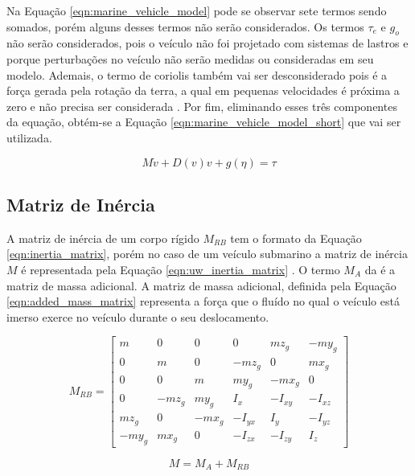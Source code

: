 Na Equação \ref{eqn:marine_vehicle_model} pode se observar sete termos sendo somados, porém alguns desses termos não serão considerados. Os termos $\tau_e$ e $g_o$ não serão considerados, pois o veículo não foi projetado com sistemas de lastros e porque perturbações no veículo não serão medidas ou consideradas em seu modelo. Ademais, o termo de coriolis também vai ser desconsiderado pois é a força gerada pela rotação da terra, a qual em pequenas velocidades é próxima a zero e não precisa ser considerada \cite{rov_modeling_1} \cite{rov_modeling_2}. Por fim, eliminando esses três componentes da equação, obtém-se a Equação \ref{eqn:marine_vehicle_model_short}  que vai ser utilizada.

\begin{equation}
	\label{eqn:marine_vehicle_model_short}
	M\dot{v} + D(v)v + g(\eta) = \tau 
\end{equation}

\subsection{Matriz de Inércia}

A matriz de inércia de um corpo rígido $M_{RB}$ tem o formato da Equação \ref{eqn:inertia_matrix}, porém no caso de um veículo submarino a matriz de inércia $M$ é representada pela Equação \ref{eqn:uw_inertia_matrix} \cite{fossen2011handbook}. O termo $M_A$ da é a matriz de massa adicional. A matriz de massa adicional, definida pela Equação \ref{eqn:added_mass_matrix} representa a força que o fluído no qual o veículo está imerso exerce no veículo durante o seu deslocamento. 

\begin{equation}
	\label{eqn:inertia_matrix}
	M_{RB} = 
	\begin{bmatrix}
		m & 0 & 0 & 0 & mz_g & -my_g\\
		0 & m & 0 & -mz_g & 0 & mx_g\\
		0 & 0 & m & my_g & -mx_g & 0\\
		0 & -mz_g & my_g & I_x & -I_{xy} & -I_{xz}\\
		mz_g & 0 & -mx_g & -I_{yx} & I_y & -I_{yz}\\
		-my_g & mx_g & 0 & -I_{zx} & -I_{zy} & I_z				
	\end{bmatrix}
\end{equation}

\begin{equation}
	\label{eqn:uw_inertia_matrix}
	M = M_A + M_{RB}
\end{equation}

